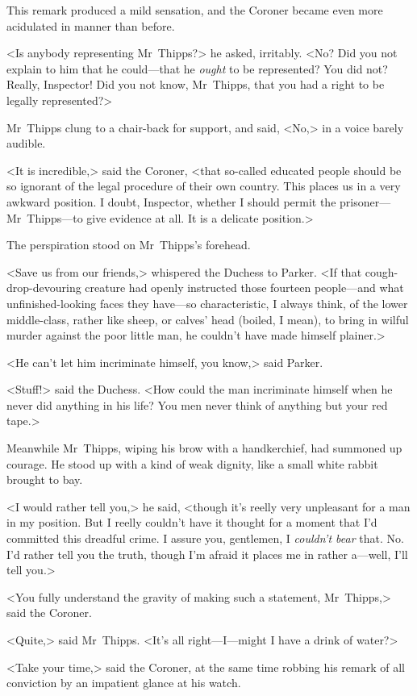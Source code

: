 This remark produced a mild sensation, and the Coroner became even more acidulated in manner than before.

<Is anybody representing Mr~Thipps?> he asked, irritably. <No? Did you not explain to him that he could—that he \emph{ought} to be represented? You did not? Really, Inspector! Did you not know, Mr~Thipps, that you had a right to be legally represented?>

Mr~Thipps clung to a chair-back for support, and said, <No,> in a voice barely audible.

<It is incredible,> said the Coroner, <that so-called educated people should be so ignorant of the legal procedure of their own country. This places us in a very awkward position. I doubt, Inspector, whether I should permit the prisoner—Mr~Thipps—to give evidence at all. It is a delicate position.>

The perspiration stood on Mr~Thipps's forehead.

<Save us from our friends,> whispered the Duchess to Parker. <If that cough-drop-devouring creature had openly instructed those fourteen people—and what unfinished-looking faces they have—so characteristic, I always think, of the lower middle-class, rather like sheep, or calves' head (boiled, I mean), to bring in wilful murder against the poor little man, he couldn't have made himself plainer.>

<He can't let him incriminate himself, you know,> said Parker.

<Stuff!> said the Duchess. <How could the man incriminate himself when he never did anything in his life? You men never think of anything but your red tape.>

Meanwhile Mr~Thipps, wiping his brow with a handkerchief, had summoned up courage. He stood up with a kind of weak dignity, like a small white rabbit brought to bay.

<I would rather tell you,> he said, <though it's reelly very unpleasant for a man in my position. But I reelly couldn't have it thought for a moment that I'd committed this dreadful crime. I assure you, gentlemen, I \emph{couldn't bear} that. No. I'd rather tell you the truth, though I'm afraid it places me in rather a—well, I'll tell you.>

<You fully understand the gravity of making such a statement, Mr~Thipps,> said the Coroner.

<Quite,> said Mr~Thipps. <It's all right—I—might I have a drink of water?>

<Take your time,> said the Coroner, at the same time robbing his remark of all conviction by an impatient glance at his watch.

